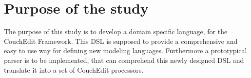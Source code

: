 \documentclass[10pt,a4paper,oneside]{scrartcl}
\newcommand\hint[2]{
\ifthenelse{\boolean{showhints}}{
\begin{center}
\colorbox{black!10}{
\begin{minipage}{.963\textwidth}
#2\hfill\textbf{#1}
\end{minipage}
}\end{center}}{}
}
\begin{document}





\section{Purpose of the study}


The purpose of this study is to develop a domain specific language, for the CouchEdit Framework. This DSL is supposed to provide a comprehensive and easy to use way for defining new modeling languages. Furthermore a prototypical parser is to be implemented, that can comprehend this newly designed DSL and translate it into a set of CouchEdit processors.
\end{document}
